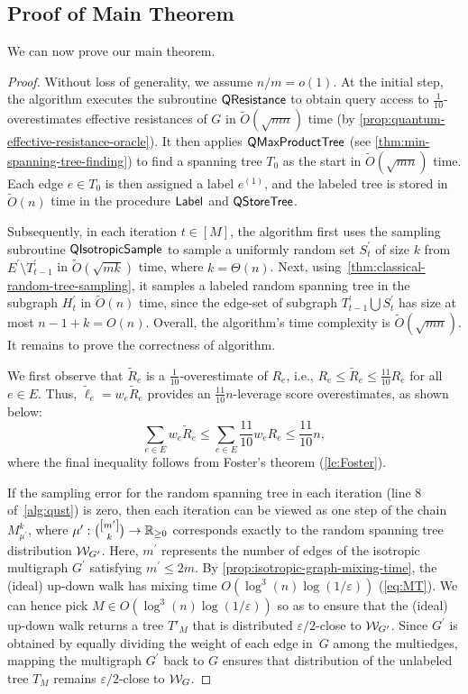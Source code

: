 \documentclass[11pt]{article}
\newcommand{\parens}[1]{( #1 )}
\newcommand{\sqb}[1]{\left[ #1 \right]}
\begin{document}
{\subsection{Proof of Main Theorem}
We can now prove our main theorem.
\begin{proof}
Without loss of generality, we assume $ n/m =o \parens{1}$.
At the initial step, 
the algorithm executes the subroutine $\mathsf{QResistance}$
to obtain query access to $\frac{1}{10}$-overestimates effective resistances of $G$
in $\widetilde{O}\parens{\sqrt{mn}}$ time (by \cref{prop:quantum-effective-resistance-oracle}). 
It then applies $\mathsf{QMaxProductTree}$
(see \cref{thm:min-spanning-tree-finding}) to find a spanning tree $T_{0}$ as the start in $\widetilde{O}\parens{\sqrt{mn}}$ time. 
Each edge $e \in T_0$ is then assigned a label $e^{(1)}$, and the labeled tree is stored in $\widetilde{O}(n)$ time
in the procedure $\mathsf{Label}$ and $\mathsf{QStoreTree}$.

Subsequently, in each iteration $t \in \sqb{M}$, the algorithm first uses the
sampling subroutine $\mathsf{QIsotropicSample}$ to sample a uniformly random set
$S^\prime_{t}$ of size $k$ from $E^\prime\setminus T^\prime_{t-1}$ in
$\widetilde O \parens{\sqrt{mk}}$ time, where $k=\Theta(n)$.
Next, using~\cref{thm:classical-random-tree-sampling}, it samples a labeled
random spanning tree in the subgraph $H ^\prime_t$ in $\widetilde{O}\parens{n}$
time, since the edge-set of subgraph $T ^\prime _{t-1}\bigcup S^\prime _{t}$ has
size at most $n-1+k= O \parens{n}$.
Overall, the algorithm's time complexity is $\widetilde{O}\parens{\sqrt{mn}}$.
It remains to prove the correctness of algorithm.

We first observe that $\widetilde{R}_e$ is a $\frac{1}{10}$-overestimate of $R_e$, i.e., $R_e \leq \widetilde{R}_e\leq \frac{11}{10} R_e $ for all $e \in E$. Thus, $\widetilde{\ell}_e = w_e \widetilde{R}_e$ provides an $\frac{11}{10} n$-leverage score overestimates, as shown below:
\begin{equation*}
	\sum_{e \in E} w_e \widetilde R_e \leq \sum_{e \in E} \frac{11}{10} w_e R_e \leq \frac{11}{10} n,
\end{equation*}
where the final inequality follows from Foster’s theorem (\cref{le:Foster}).


If the sampling error for the random spanning tree in each iteration (line 8 of~\cref{alg:qust}) is zero, 
then each iteration can be viewed as one step of the chain $M_{\mu^{\prime}}^k$, 
where $\mu^{\prime}: \binom{\sqb{m^{\prime}}}{k} \to \RR_{\geq 0}$ 
corresponds exactly to the random spanning tree distribution $\mathcal{W}_{G^{\prime}}$. 
Here, $m^{\prime}$ represents the number of edges 
of the isotropic multigraph $G^{\prime}$ satisfying $m^\prime\leq 2m$.
By \cref{prop:isotropic-graph-mixing-time}, the (ideal) up-down walk has mixing time $O(\log^3(n) \log(1/\varepsilon))$ (\cref{eq:MT}). 
We can hence pick $M \in O(\log^3(n) \log(1/\varepsilon))$ so as to ensure that the (ideal) up-down walk returns a tree $T'_M$ that is distributed $\varepsilon/2$-close to $\mathcal{W}_{G'}$.
Since $G^{\prime}$ is obtained by equally dividing the weight of each edge in~$G$ among the multiedges, mapping the multigraph $G^{\prime}$ back to $G$ ensures that distribution of the unlabeled  tree $T_M$ remains $\varepsilon/2$-close to $\mathcal{W}_G$.


\end{proof}}
\end{document}
